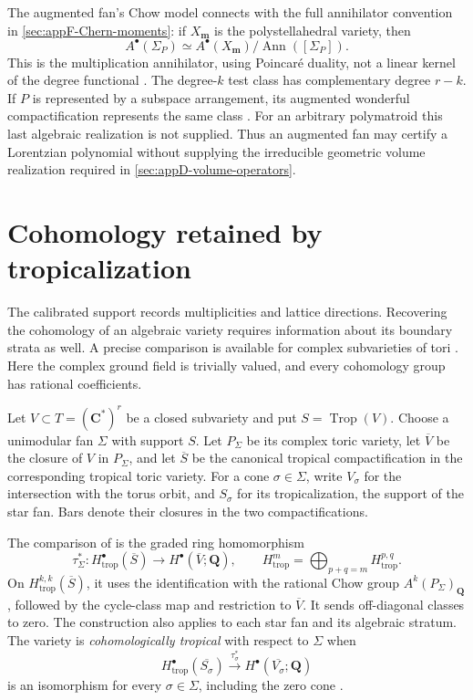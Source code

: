 The augmented fan's Chow model connects with the full
annihilator convention in \cref{sec:appF-Chern-moments}:
if $X_{\mathbf m}$ is the polystellahedral variety, then
\[
 A^\bullet(\Sigma_P)
   \simeq A^\bullet(X_{\mathbf m})/\operatorname{Ann}([\Sigma_P]).
\tag{G.41}\label{eq:appG-augmented-polymatroid-annihilator}
\]
This is the multiplication annihilator, using Poincar\'e
duality, not a linear kernel of the degree functional
\cite[Corollary~3.18]{EurLarson23PolymatroidsV2}.
The degree-$k$ test class has complementary degree $r-k$.
If $P$ is represented by a subspace arrangement, its augmented
wonderful compactification represents the same class
\cite[Proposition~3.20]{EurLarson23PolymatroidsV2}.
For an arbitrary polymatroid this last algebraic realization
is not supplied. Thus an augmented fan may certify a
Lorentzian polynomial without supplying the irreducible
geometric volume realization required in
\cref{sec:appD-volume-operators}.

\section{Cohomology retained by tropicalization}
\label{sec:appG-cohomologically-tropical}

The calibrated support records multiplicities and lattice directions.
Recovering the cohomology of an algebraic variety requires information
about its boundary strata as well. A precise comparison is available for
complex subvarieties of tori \cite{AAPS25Cohomologically}.
Here the complex ground field is trivially valued, and every cohomology
group has rational coefficients.

Let $V\subset T=(\mathbf C^*)^r$ be a closed subvariety and put
$S=\operatorname{Trop}(V)$. Choose a unimodular fan $\Sigma$ with support
$S$. Let $P_\Sigma$ be its complex toric variety, let $\overline V$ be
the closure of $V$ in $P_\Sigma$, and let $\overline S$ be the canonical
tropical compactification in the corresponding tropical toric variety.
For a cone $\sigma\in\Sigma$, write $V_\sigma$ for the intersection
with the torus orbit, and $S_\sigma$ for its tropicalization, the support
of the star fan. Bars denote their closures in the two compactifications.

The comparison of \cite[Definition~3.1 and \S2.7]{AAPS25Cohomologically}
is the graded ring homomorphism
\[
 \tau_\Sigma^*:H^\bullet_{\mathrm{trop}}(\overline S)
          \longrightarrow H^\bullet(\overline V;\mathbf Q),
 \qquad
 H^m_{\mathrm{trop}}=\bigoplus_{p+q=m}H^{p,q}_{\mathrm{trop}}.
\]
On $H^{k,k}_{\mathrm{trop}}(\overline S)$, it uses the identification
with the rational Chow group $A^k(P_\Sigma)_{\mathbf Q}$, followed by
the cycle-class map and restriction to $\overline V$. It sends
off-diagonal classes to zero. The construction also applies to each star
fan and its algebraic stratum. The variety is \emph{cohomologically
tropical} with respect to $\Sigma$ when
\[
 H^\bullet_{\mathrm{trop}}(\overline{S_\sigma})
       \xrightarrow{\ \tau_\sigma^*\ }
 H^\bullet(\overline{V_\sigma};\mathbf Q)
\]
is an isomorphism for every $\sigma\in\Sigma$, including the zero cone
\cite[Definition~1.1]{AAPS25Cohomologically}.

